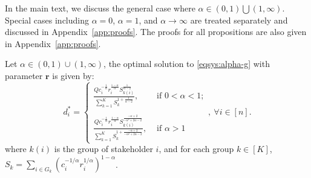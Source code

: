 \documentclass[ijoc,sglanonrev]{informs4}
\begin{document}
In the main text, we discuss the general case where $\alpha \in (0,1) \bigcup (1,\infty)$. Special cases including $\alpha = 0$, $\alpha = 1$, and $\alpha \to \infty$ are treated separately and discussed in Appendix~\ref{app:proofs}. The proofs for all propositions are also given in Appendix~\ref{app:proofs}.

\begin{proposition} 
\label{prop:closed_form_solution_group-1}
Let $\alpha \in (0, 1) \cup (1, \infty)$, the optimal solution to \eqref{eqsys:alpha-g} with parameter $\mathbf{r}$ is given by:
\[
d_i^* = \begin{cases}
\frac{Q c_i^{-\frac{1}{\alpha}}r_i^{\frac{1-\alpha}{\alpha}}S_{k(i)}^{\frac{1}{\alpha-2}}}{\sum_{k=1}^K S_k^{1 +\frac{1}{\alpha-2}}} , & \text{ if } 0 < \alpha < 1; \\
\\
\frac{Q c_i^{-\frac{1}{\alpha}}r_i^{\frac{1-\alpha}{\alpha}} S_{k(i)}^{\frac{-\alpha+2}{-\alpha^2 + 2\alpha-2}}}{\sum_{k=1}^K S_k^{1 + \frac{-\alpha+2}{-\alpha^2 + 2\alpha-2}}}, & \text{ if } \alpha > 1
\end{cases}, ~\forall i \in [n].
\]
where $k(i)$ is the group of stakeholder $i$, and for each group $k \in [K]$, $S_k = \sum_{i \in G_k} \left(c_i^{-1/\alpha} r_i^{1/\alpha} \right)^{1-\alpha}$.
\end{proposition}
\end{document}
